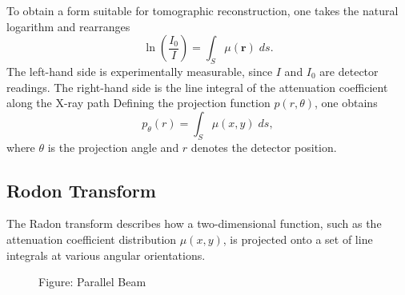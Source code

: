 \documentclass[../../../main.tex]{subfiles}
\begin{document}
To obtain a form suitable for tomographic reconstruction, one takes the natural logarithm and rearranges
\begin{equation*}
    \ln\!\left(\frac{I_0}{I}\right) = \int_{S} \mu(\mathbf{r}) \; ds.
\end{equation*}
The left-hand side is experimentally measurable, since $I$ and $I_0$ are detector readings.
The right-hand side is the line integral of the attenuation coefficient along the X-ray path
Defining the projection function $p(r,\theta)$, one obtains
\begin{equation*}
    p_\theta(r)    = \int_{S} \mu(x,y) \; ds,
\end{equation*}
where $\theta$ is the projection angle and $r$ denotes the detector position.

\subsection{Rodon Transform}
The Radon transform describes how a two-dimensional function, such as the attenuation coefficient distribution $\mu(x,y)$, is projected onto a set of line integrals at various angular orientations.

\begin{figure*}
    \centering
    \caption*{Figure: Parallel Beam}
\end{figure*}
\end{document}
